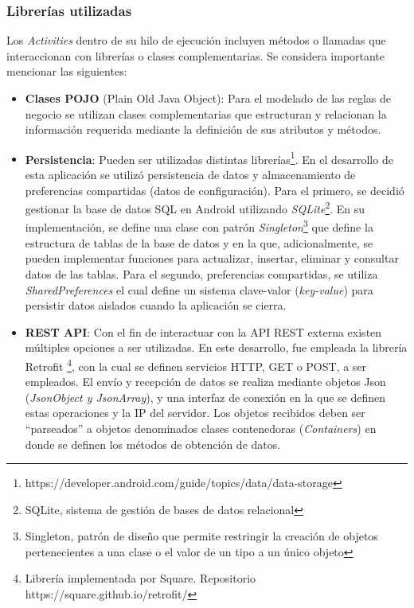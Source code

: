     \subsubsection{Librerías utilizadas}
     \par Los \textit{Activities} dentro de su hilo de ejecución incluyen métodos o llamadas que interaccionan con librerías o clases complementarias. Se considera importante mencionar las siguientes:
     \begin{itemize}
         \item \textbf{Clases POJO} (Plain Old Java Object): Para el modelado de las reglas de negocio se utilizan clases complementarias que estructuran y relacionan la información requerida mediante la definición de sus atributos y métodos.
         
         \item \textbf{Persistencia}: Pueden ser utilizadas distintas librerías\footnote{https://developer.android.com/guide/topics/data/data-storage}. En el desarrollo de esta aplicación se utilizó persistencia de datos y almacenamiento de preferencias compartidas (datos de configuración). Para el primero, se decidió gestionar la base de datos SQL en Android utilizando \textit{SQLite}\footnote{SQLite, sistema de gestión de bases de datos relacional}. En su implementación, se define una clase con patrón \textit{Singleton}\footnote{Singleton, patrón de diseño que permite restringir la creación de objetos pertenecientes a una clase o el valor de un tipo a un único objeto} que define la estructura de tablas de la base de datos y en la que, adicionalmente, se pueden implementar funciones para actualizar, insertar, eliminar y consultar datos de las tablas. Para el segundo, preferencias compartidas, se utiliza \textit{SharedPreferences} el cual define un sistema clave-valor (\textit{key-value}) para persistir datos aislados cuando la aplicación se cierra.
         
         \item \textbf{REST API}: Con el fin de interactuar con la API REST externa existen múltiples opciones a ser utilizadas. En este desarrollo, fue empleada la librería Retrofit \footnote{Librería implementada por Square. Repositorio https://square.github.io/retrofit/}, con la cual se definen servicios HTTP, GET o POST, a ser empleados. El envío y recepción de datos se realiza mediante objetos Json (\textit{JsonObject y JsonArray}), y una interfaz de conexión en la que se definen estas operaciones y la IP del servidor. Los objetos recibidos deben ser ``parseados'' a objetos denominados clases contenedoras (\textit{Containers}) en donde se definen los métodos de obtención de datos. 
         

\end{itemize}
